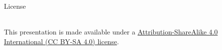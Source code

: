 \begin{frame}[c]{License}
  \begin{center}
    \ccbysa{}\\
    \vspace{0.5cm}
    This presentation is made available under a \href{https://creativecommons.org/licenses/by-sa/4.0/}{Attribution-ShareAlike 4.0 International (CC BY-SA 4.0) license}.\\
  \end{center}
\end{frame}

